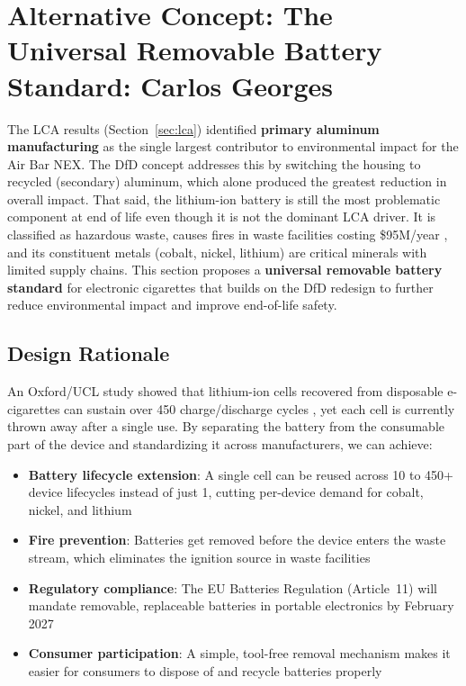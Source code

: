 \section{Alternative Concept: The Universal Removable Battery Standard: Carlos Georges}
\label{sec:alternative}

The LCA results (Section~\ref{sec:lca}) identified \textbf{primary aluminum manufacturing} as the single largest contributor to environmental impact for the Air Bar NEX. The DfD concept addresses this by switching the housing to recycled (secondary) aluminum, which alone produced the greatest reduction in overall impact. That said, the lithium-ion battery is still the most problematic component at end of life even though it is not the dominant LCA driver. It is classified as hazardous waste, causes fires in waste facilities costing \$95M/year \cite{wmw2025}, and its constituent metals (cobalt, nickel, lithium) are critical minerals with limited supply chains. This section proposes a \textbf{universal removable battery standard} for electronic cigarettes that builds on the DfD redesign to further reduce environmental impact and improve end-of-life safety.

\subsection{Design Rationale}

An Oxford/UCL study showed that lithium-ion cells recovered from disposable e-cigarettes can sustain over 450 charge/discharge cycles \cite{williams2023}, yet each cell is currently thrown away after a single use. By separating the battery from the consumable part of the device and standardizing it across manufacturers, we can achieve:
\begin{itemize}
    \item \textbf{Battery lifecycle extension}: A single cell can be reused across 10 to 450+ device lifecycles instead of just 1, cutting per-device demand for cobalt, nickel, and lithium
    \item \textbf{Fire prevention}: Batteries get removed before the device enters the waste stream, which eliminates the ignition source in waste facilities
    \item \textbf{Regulatory compliance}: The EU Batteries Regulation (Article~11) will mandate removable, replaceable batteries in portable electronics by February 2027 \cite{eu_batteries_2023}
    \item \textbf{Consumer participation}: A simple, tool-free removal mechanism makes it easier for consumers to dispose of and recycle batteries properly
\end{itemize}


